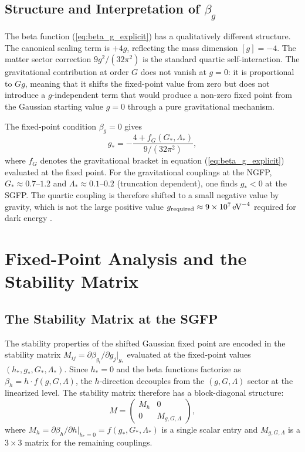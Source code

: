\documentclass[12pt,a4paper]{article}
\begin{document}
\subsection{Structure and Interpretation of $\beta_g$}

The beta function (\ref{eq:beta_g_explicit}) has a qualitatively different
structure. The canonical scaling term is $+4g$, reflecting the mass dimension
$[g] = -4$. The matter sector correction $9g^2/(32\pi^2)$ is the standard
quartic self-interaction. The gravitational contribution at order $G$ does not
vanish at $g = 0$: it is proportional to $Gg$, meaning that it shifts the
fixed-point value from zero but does not introduce a $g$-independent term that
would produce a non-zero fixed point from the Gaussian starting value $g = 0$
through a pure gravitational mechanism.

The fixed-point condition $\beta_g = 0$ gives
\begin{equation}
g_* = -\frac{4 + f_G(G_*,\Lambda_*)}{9/(32\pi^2)},
\end{equation}
where $f_G$ denotes the gravitational bracket in equation (\ref{eq:beta_g_explicit})
evaluated at the fixed point. For the gravitational couplings at the NGFP,
$G_* \approx 0.7$--$1.2$ and $\Lambda_* \approx 0.1$--$0.2$ (truncation
dependent), one finds $g_* < 0$ at the SGFP. The quartic coupling is therefore
shifted to a small negative value by gravity, which is
not the large positive value $g_{\rm required} \approx 9 \times 10^7\,\text{eV}^{-4}$
required for dark energy \cite{EichhornLinoWagner2023}.

\section{Fixed-Point Analysis and the Stability Matrix}
\label{sec:stability_matrix}

\subsection{The Stability Matrix at the SGFP}

The stability properties of the shifted Gaussian fixed point are encoded in the
stability matrix $M_{ij} = \partial\beta_{g_i}/\partial g_j|_{g_*}$ evaluated
at the fixed-point values $(h_*, g_*, G_*, \Lambda_*)$. Since $h_* = 0$ and
the beta functions factorize as $\beta_h = h\cdot f(g,G,\Lambda)$, the
$h$-direction decouples from the $(g,G,\Lambda)$ sector at the linearized
level. The stability matrix therefore has a block-diagonal structure:
\begin{equation}
M = \begin{pmatrix}
M_h & 0 \\
0 & M_{g,G,\Lambda}
\end{pmatrix},
\end{equation}
where $M_h = \partial\beta_h/\partial h|_{h_*=0} = f(g_*,G_*,\Lambda_*)$ is
a single scalar entry and $M_{g,G,\Lambda}$ is a $3\times 3$ matrix for the
remaining couplings.
\end{document}
